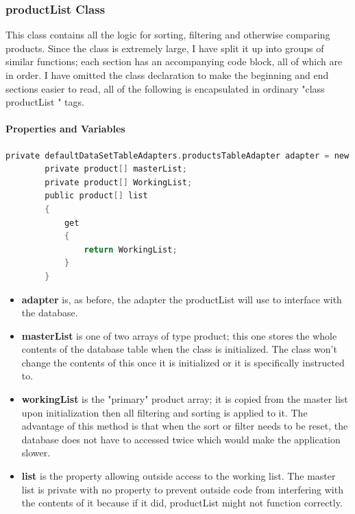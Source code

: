 ﻿\documentclass{article}
\begin{document}
    \subsubsection{productList Class}
    This class contains all the logic for sorting, filtering and otherwise comparing products.
    Since the class is extremely large, I have split it up into groups of similar functions; each section has an accompanying code block, all of which are in order.
    I have omitted the class declaration to make the beginning and end sections easier to read, all of the following is encapsulated in ordinary "class productList {}" tags.
    \paragraph{Properties and Variables}
    \begin{lstlisting}[language=C]
		private defaultDataSetTableAdapters.productsTableAdapter adapter = new defaultDataSetTableAdapters.productsTableAdapter();
		private product[] masterList;
		private product[] WorkingList;
		public product[] list
		{
			get
			{
				return WorkingList;
			}
		}
    \end{lstlisting}
    \begin{itemize}
        \item \textbf{adapter} is, as before, the adapter the productList will use to interface with the database.
        \item \textbf{masterList} is one of two arrays of type product; this one stores the whole contents of the database table when the class is initialized.
        The class won't change the contents of this once it is initialized or it is specifically instructed to.
        \item \textbf{workingList} is the "primary" product array; it is copied from the master list upon initialization then all filtering and sorting is applied to it.
        The advantage of this method is that when the sort or filter needs to be reset, the database does not have to accessed twice which would make the application slower.
        \item \textbf{list} is the property allowing outside access to the working list.
        The master list is private with no property to prevent outside code from interfering with the contents of it because if it did, productList might not function correctly.
    \end{itemize}
\end{document}
